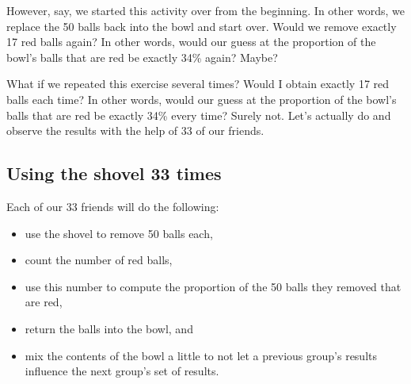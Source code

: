 \documentclass[12pt, krantz2,]{krantz}
\providecommand{\tightlist}{%
  \setlength{\itemsep}{0pt}\setlength{\parskip}{0pt}}
\begin{document}
However, say, we started this activity over from the beginning. In other words, we replace the 50 balls back into the bowl and start over. Would we remove exactly 17 red balls again? In other words, would our guess at the proportion of the bowl's balls that are red be exactly 34\% again? Maybe?

What if we repeated this exercise several times? Would I obtain exactly 17 red balls each time? In other words, would our guess at the proportion of the bowl's balls that are red be exactly 34\% every time? Surely not. Let's actually do and observe the results with the help of 33 of our friends.

\hypertarget{student-shovels}{%
\subsection{Using the shovel 33 times}\label{student-shovels}}

Each of our 33 friends will do the following:

\begin{itemize}
\tightlist
\item
  use the shovel to remove 50 balls each,
\item
  count the number of red balls,
\item
  use this number to compute the proportion of the 50 balls they removed that are red,
\item
  return the balls into the bowl, and
\item
  mix the contents of the bowl a little to not let a previous group's results influence the next group's set of results.
\end{itemize}
\end{document}
